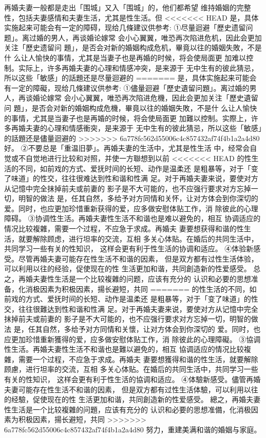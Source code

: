 \documentclass[12pt,UTF8]{ctexbook}
\begin{document}
再婚夫妻一般都是走出「围城」又入「围城」的，他们都希望
维持婚姻的完整性，包括夫妻感情和夫妻生活，尤其是性生活。但
<<<<<<< HEAD
是，具体实施起来可能会有一定的障碍，现给几條建议供参考:
①尽量迴避「歷史遗留问题」。离过婚的男人，再谈婚论嫁常
会小心翼翼，唯恐再次陷进危机，因此会更加关注「歷史遗留问
題」，是否会对新的婚姻构成危机，畢竟以往的婚姻失敗，不是什
么让人愉快的事情，尤其是当妻子也是再婚的时候，将会使局面更
加难以控制。实际上，许多再婚夫妻的心理和情感冲突，是来源于
无中生有的彼此猜忌，所以这些「敏感」的話題还是尽量迴避的
=======
是，具体实施起来可能会有一定的障礙，现给几條建议供参考:
①儘量迴避「歷史遺留问題」。离过婚的男人，再谈婚论嫁常
会小心翼翼，唯恐再次陷进危機，因此会更加关注「歷史遺留问
題」，是否会对新的婚姻构成危機，畢竟以往的婚姻失敗，不是什
么让人愉快的事情，尤其是当妻子也是再婚的时候，将会使局面更
加難以控制。实際上，许多再婚夫妻的心理和情感衝突，是来源于
无中生有的彼此猜忌，所以这些「敏感」的話題还是儘量迴避的
>>>>>>> 6a778fc562d55006c4c857432af74f4b1a2a4d80
好。
②不要总是「重温旧夢」。再婚夫妻的生活中，尤其是性生活
中，经常会自觉或不自觉地进行比较和对照，并使一方聯想到以前
<<<<<<< HEAD
的性生活的不同，如前戏的方式、爱抚时间的长短、动作是温柔还
是粗暴等，对于「变了味道」的性交，往往很难达到性和谐和性满
足。对于再婚夫妻来说，要使对方从记憶中完全抹掉前夫或前妻的
影子是不大可能的，也不应强行要求对方忘掉一切，明智的做法
是，任其自然，多给予对方同情和关怀，让对方体会到你深切的
爱。同时，也应更加珍惜重新获得的爱，应多做安慰体贴工作，消
除彼此的心理障碍。
③协调性生活。再婚夫妻性生活不和谐也是难以避免的，相互
协调适应的情况比较複雜，需要一个过程，不应急于求成。再婚夫
妻要想获得和谐的性生活，就要解除顾虑，进行坦率的交流，互相
多关心体贴。在婚后的共同生活中，共同学习一些有关的性知识，
这样会更有利于性生活的协调和适应。
④体验新感受。尽管再婚夫妻可能存在性生活不和谐的因素，
但是双方都有过性生活体验，可以利用以往的经验，促使现在的性
生活更加和谐，共同創造新的性爱感受。
总之，再婚夫妻性生活是一个比较複雜的问题，应该有充分的
认识和必要的思想准备，化消极因素为积极因素，揚长避短，共同
=======
的性生活的不同，如前戏的方式、爱抚时间的长短、动作是温柔还
是粗暴等，对于「变了味道」的性交，往往很難达到性和谐和性满
足。对于再婚夫妻来说，要使对方从记憶中完全抹掉前夫或前妻的
影子是不大可能的，也不应强行要求对方忘掉一切，明智的做法
是，任其自然，多给予对方同情和关懷，让对方体会到你深切的
爱。同时，也应更加珍惜重新獲得的爱，应多做安慰体贴工作，消
除彼此的心理障礙。
③協调性生活。再婚夫妻性生活不和谐也是難以避免的，相互
協调适应的情况比较複雜，需要一个过程，不应急于求成。再婚夫
妻要想獲得和谐的性生活，就要解除顾慮，进行坦率的交流，互相
多关心体贴。在婚后的共同生活中，共同学习一些有关的性知识，
这样会更有利于性生活的協调和适应。
④体驗新感受。儘管再婚夫妻可能存在性生活不和谐的因素，
但是双方都有过性生活体驗，可以利用以往的经驗，促使现在的性
生活更加和谐，共同創造新的性爱感受。
總之，再婚夫妻性生活是一个比较複雜的问題，应该有充分的
认识和必要的思想准備，化消极因素为积极因素，揚长避短，共同
>>>>>>> 6a778fc562d55006c4c857432af74f4b1a2a4d80
努力，重建美满和谐的婚姻与家庭。
\end{document}
